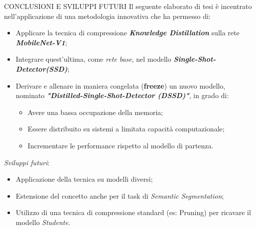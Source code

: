 \begin{frame}{CONCLUSIONI E SVILUPPI FUTURI}
    Il seguente elaborato di tesi è incentrato nell'applicazione di una metodologia innovativa che ha permesso di:
    \begin{itemize}
        \item Applicare la tecnica di compressione {\bfseries{\emph{Knowledge Distillation}}} sulla rete {\bfseries{\emph{MobileNet-V1}}};
        \item Integrare quest'ultima, come \emph{rete base}, nel modello {\bfseries{\emph{Single-Shot-Detector(SSD)}}};
        \item Derivare e allenare in maniera congelata ({\bfseries{freeze}}) un nuovo modello, nominato {\bfseries{\emph{"Distilled-Single-Shot-Detector (DSSD)"}}}, in grado di:
        \begin{itemize}
            \item Avere una bassa occupazione della memoria;
            \item Essere distribuito su sistemi a limitata capacità computazionale;
            \item Incrementare le performance rispetto al modello di partenza.
        \end{itemize}
    \end{itemize}
    \vspace{0.3cm}
    \emph{Sviluppi futuri}:
    \begin{itemize}
        \item Applicazione della tecnica su modelli diversi;
        \item Estensione del concetto anche per il task di \emph{Semantic Segmentation};
        \item Utilizzo di una tecnica di compressione standard (es: Pruning) per ricavare il modello \emph{Studente}.
    \end{itemize}
\end{frame}